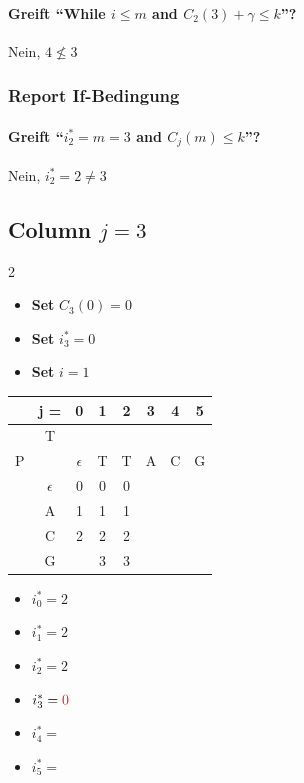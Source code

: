 \paragraph{Greift ``While $i \leq m$ and $C_2(3) + \gamma \leq k$''?} Nein, $4 \not\leq 3$

\subsubsection*{Report If-Bedingung}

\paragraph{Greift ``$i^*_2 = m = 3$ and $C_j(m) \leq k$''?} Nein, $i^*_2 = 2 \neq 3$

\newpage

\subsection*{Column $j = 3$}

\begin{multicols}{2}

    \begin{itemize}
        \item \textbf{Set} $C_3(0) = 0$
        \item \textbf{Set} $i_3^\ast = 0$
        \item \textbf{Set} $i = 1$
    \end{itemize}
    \begin{center}
        \begin{tabular}{|c c|c|c|c|c|c|c|} \hline
        &   j =     &  0            &   1   &   2   &   3   &   4   &   5   \\ \hline
        &   T       &               &       &       &       &       &       \\
        P   &       &  $\epsilon$   &   T   &   T   &   A   &   C   &   G   \\ \hline
        & $\epsilon$&       0       &0      &  0    &  \ccr0     &       &       \\ \hline
        &    A      &       1       &   1   &  1    &       &       &       \\ \hline
        &    C      &   2           &   2   &   2   &       &       &       \\ \hline
        &    G      &               &3      &  3    &       &       &       \\ \hline
        \end{tabular}
    \end{center}
    \columnbreak
    \begin{itemize}
        \item $i_0^\ast = 2$
        \item $i_1^\ast = 2 $
        \item $i_2^\ast = 2$
        \item $i_3^\ast = \textcolor{red}{0} $
        \item $i_4^\ast = $
        \item $i_5^\ast = $
    \end{itemize}
\end{multicols}

